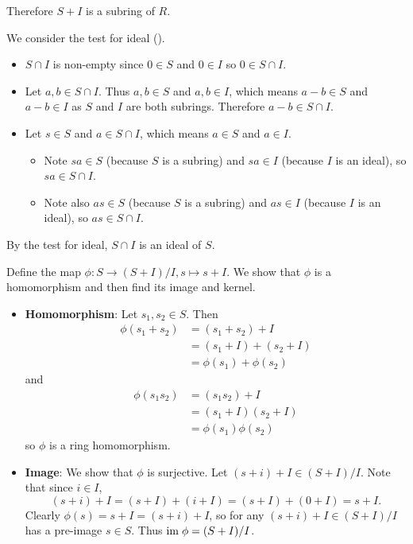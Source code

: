 \begin{questions}
\begin{partquestions}{\roman*}
        Therefore $S+I$ is a subring of $R$.

        \item We consider the test for ideal ().
        \begin{itemize}
            \item $S \cap I$ is non-empty since $0 \in S$ and $0 \in I$ so $0 \in S \cap I$.
            \item Let $a, b \in S \cap I$. Thus $a, b \in S$ and $a, b \in I$, which means $a - b \in S$ and $a - b \in I$ as $S$ and $I$ are both subrings. Therefore $a - b \in S \cap I$.
            \item Let $s \in S$ and $a \in S \cap I$, which means $a \in S$ and $a \in I$.
            \begin{itemize}
                \item Note $sa \in S$ (because $S$ is a subring) and $sa \in I$ (because $I$ is an ideal), so $sa \in S \cap I$.
                \item Note also $as \in S$ (because $S$ is a subring) and $as \in I$ (because $I$ is an ideal), so $as \in S \cap I$.
            \end{itemize}
        \end{itemize}
        By the test for ideal, $S \cap I$ is an ideal of $S$.

        \item Define the map $\phi: S \to (S+I)/I, s \mapsto s+I$. We show that $\phi$ is a homomorphism and then find its image and kernel.
        \begin{itemize}
            \item \textbf{Homomorphism}: Let $s_1, s_2 \in S$. Then
            \begin{align*}
                \phi(s_1 + s_2) &= (s_1 + s_2) + I\\
                &= (s_1 + I) + (s_2 + I)\\
                &= \phi(s_1) + \phi(s_2)
            \end{align*}
            and
            \begin{align*}
                \phi(s_1s_2) &= (s_1s_2) + I\\
                &= (s_1+I)(s_2+I)\\
                &= \phi(s_1)\phi(s_2)
            \end{align*}
            so $\phi$ is a ring homomorphism.

            \item \textbf{Image}: We show that $\phi$ is surjective. Let $(s+i) + I \in (S+I)/I$. Note that since $i \in I$,
            \[
                (s+i)+I = (s+I) + (i+I) = (s+I) + (0+I) = s+I.
            \]
            Clearly $\phi(s) = s+I = (s+i)+I$, so for any $(s+i) + I \in (S+I)/I$ has a pre-image $s \in S$. Thus $\mathrm{im}\;\phi = (S+I)/I$.


\end{itemize}
\end{partquestions}
\end{questions}
